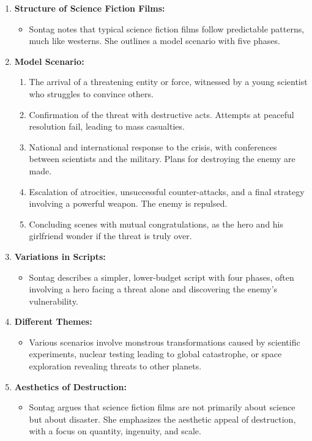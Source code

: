 \documentclass[11pt,fleqn]{book}
\begin{document}
\begin{enumerate}[label=\arabic*.]
    \item \textbf{Structure of Science Fiction Films:}
    \begin{itemize}
        \item Sontag notes that typical science fiction films follow predictable patterns, much like westerns. She outlines a model scenario with five phases.
    \end{itemize}

    \item \textbf{Model Scenario:}
    \begin{enumerate}[label=(\roman*)]
        \item The arrival of a threatening entity or force, witnessed by a young scientist who struggles to convince others.
        \item Confirmation of the threat with destructive acts. Attempts at peaceful resolution fail, leading to mass casualties.
        \item National and international response to the crisis, with conferences between scientists and the military. Plans for destroying the enemy are made.
        \item Escalation of atrocities, unsuccessful counter-attacks, and a final strategy involving a powerful weapon. The enemy is repulsed.
        \item Concluding scenes with mutual congratulations, as the hero and his girlfriend wonder if the threat is truly over.
    \end{enumerate}

    \item \textbf{Variations in Scripts:}
    \begin{itemize}
        \item Sontag describes a simpler, lower-budget script with four phases, often involving a hero facing a threat alone and discovering the enemy's vulnerability.
    \end{itemize}

    \item \textbf{Different Themes:}
    \begin{itemize}
        \item Various scenarios involve monstrous transformations caused by scientific experiments, nuclear testing leading to global catastrophe, or space exploration revealing threats to other planets.
    \end{itemize}

    \item \textbf{Aesthetics of Destruction:}
    \begin{itemize}
        \item Sontag argues that science fiction films are not primarily about science but about disaster. She emphasizes the aesthetic appeal of destruction, with a focus on quantity, ingenuity, and scale.
    \end{itemize}


\end{enumerate}
\end{document}
